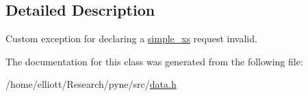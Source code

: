 \subsection{Detailed Description}
Custom exception for declaring a \hyperlink{structsimple__xs}{simple\-\_\-xs} request invalid. 

The documentation for this class was generated from the following file\-:\begin{DoxyCompactItemize}
\item 
/home/elliott/\-Research/pyne/src/\hyperlink{data_8h}{data.\-h}\end{DoxyCompactItemize}
